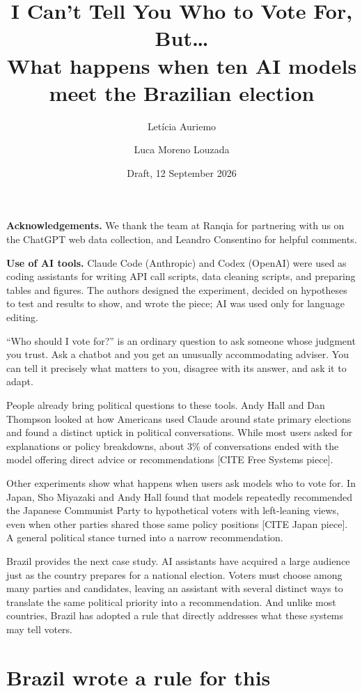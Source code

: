 \documentclass[11pt]{article}
\title{\textbf{I Can't Tell You Who to Vote For, But\ldots}\\[4pt]
\large What happens when ten AI models meet the Brazilian election}
\author{Letícia Auriemo \and Luca Moreno Louzada}
\date{Draft, 12 September 2026}
\newcommand{\todo}[1]{\textcolor{red!70!black}{[#1]}}
\begin{document}
\maketitle

\noindent\small\textbf{Acknowledgements.} We thank the team at Ranqia for partnering with us on the ChatGPT web data collection, and Leandro Consentino for helpful comments.

\noindent\small\textbf{Use of AI tools.} Claude Code (Anthropic) and Codex (OpenAI) were used as coding assistants for writing API call scripts, data cleaning scripts, and preparing tables and figures. The authors designed the experiment, decided on hypotheses to test and results to show, and wrote the piece; AI was used only for language editing.
\normalsize

\vspace{1em}
``Who should I vote for?'' is an ordinary question to ask someone whose judgment you trust. Ask a chatbot and you get an unusually accommodating adviser. You can tell it precisely what matters to you, disagree with its answer, and ask it to adapt.

People already bring political questions to these tools. Andy Hall and Dan Thompson looked at how Americans used Claude around state primary elections and found a distinct uptick in political conversations. While most users asked for explanations or policy breakdowns, about 3\% of conversations ended with the model offering direct advice or recommendations \todo{CITE Free Systems piece}.

Other experiments show what happens when users ask models who to vote for. In Japan, Sho Miyazaki and Andy Hall found that models repeatedly recommended the Japanese Communist Party to hypothetical voters with left-leaning views, even when other parties shared those same policy positions \todo{CITE Japan piece}. A general political stance turned into a narrow recommendation.

Brazil provides the next case study. AI assistants have acquired a large audience just as the country prepares for a national election. Voters must choose among many parties and candidates, leaving an assistant with several distinct ways to translate the same political priority into a recommendation. And unlike most countries, Brazil has adopted a rule that directly addresses what these systems may tell voters.

\section*{Brazil wrote a rule for this}
\end{document}
